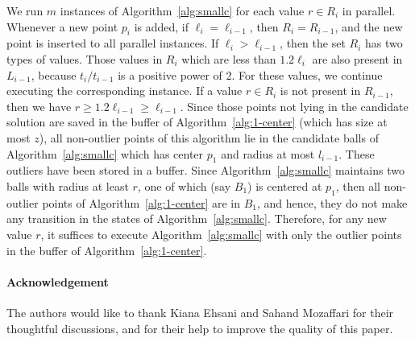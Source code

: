 \documentclass[envcountsame]{cls/cccg15}
\renewcommand{\O}{\ensuremath{{O}}}
\newcommand{\gee}{\geqslant}
\renewcommand{\ge}{\gee}
\newcommand{\eps}{\varepsilon}
\newcommand{\REM}[1]{}
\begin{document}
We run $m$ instances of Algorithm~\ref{alg:smallc} for each value $r \in R_i$ in parallel. 
Whenever a new point $p_i$ is added, 
if $\ell_i=\ell_{i-1}$, then $R_i = R_{i-1}$,
and the new point is inserted to all parallel instances. %
If $\ell_i > \ell_{i-1}$, then the set $R_i$ has two types of values.
Those values in $R_i$ which are less than $1.2\ell_i$ are also present in $L_{i-1}$,
because $t_i / t_{i-1}$ is a positive power of 2.
For these values, we continue executing the corresponding instance.
If a value $r \in R_i$ is not present in $R_{i-1}$, 
then we have $r \ge 1.2 \ell_{i - 1} \ge \ell_{i-1}$.
Since those points not lying in the candidate solution 
are saved in the buffer of Algorithm~\ref{alg:1-center} (which has size at most $z$), 
all non-outlier points of this algorithm lie in the candidate balls of Algorithm~\ref{alg:smallc} which has center $p_1$ and radius at most $l_{i-1}$. 
These outliers have been stored in a buffer. 
Since Algorithm~\ref{alg:smallc} maintains two balls with radius at least $r$, 
one of which (say $B_1$) is centered at $p_1$, 
then all non-outlier points of Algorithm~\ref{alg:1-center} are in $B_1$,
and hence, they do not make any transition in the states of Algorithm~\ref{alg:smallc}.
Therefore, for any new value $r$, 
it suffices to execute Algorithm~\ref{alg:smallc} with only the 
outlier points in the buffer of Algorithm~\ref{alg:1-center}.


\REM{ }%
\paragraph{Acknowledgement}
The authors would like to thank Kiana Ehsani and Sahand Mozaffari 
for their thoughtful discussions, 
and for their help to improve the quality of this paper.
\end{document}
